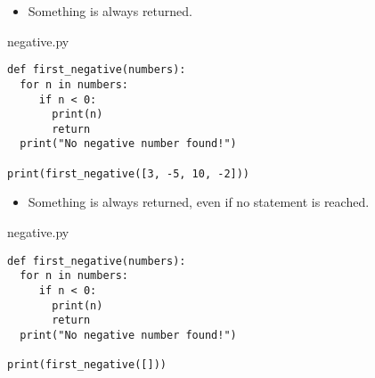 \documentclass[aspectratio=1610,slidestop]{beamer}
\begin{document}
\begin{pframe}
 \addtocounter{framenumber}{-1}
 \begin{itemize}
  \item Something is always returned.
 \end{itemize}
 \medskip

 \begin{minipage}[t]{0.52\textwidth}
  \begin{pythonfile}{negative.py}
   \begin{verbatim}
def first_negative(numbers):
  for n in numbers:
     if n < 0:
       print(n)
       return
  print("No negative number found!")

print(first_negative([3, -5, 10, -2]))
   \end{verbatim}
  \end{pythonfile}
 \end{minipage}\qquad
 \pause
 \begin{minipage}[t]{0.42\textwidth}
 \vspace{-4.15cm}
 \begin{terminal}
 \end{terminal}
 \end{minipage}
\end{pframe}


\begin{pframe}
 \begin{itemize}
  \item Something is always returned, even if no  statement is reached.
 \end{itemize}
 \medskip

 \begin{minipage}[t]{0.52\textwidth}
  \begin{pythonfile}{negative.py}
   \begin{verbatim}
def first_negative(numbers):
  for n in numbers:
     if n < 0:
       print(n)
       return
  print("No negative number found!")

print(first_negative([]))
   \end{verbatim}
  \end{pythonfile}
 \end{minipage}\qquad
 \pause
 \begin{minipage}[t]{0.42\textwidth}
 \vspace{-4.15cm}
 \begin{terminal}
 \end{terminal}
 \end{minipage}
\end{pframe}
\end{document}
